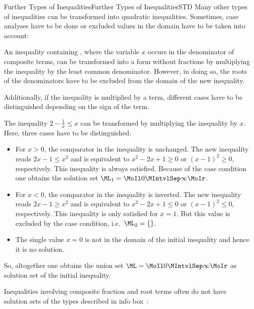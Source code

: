 \begin{MXContent}{Further Types of Inequalities}{Further Types of Inequalities}{STD}
Many other types of inequalities can be transformed into quadratic inequalities. Sometimes, 
case analyses have to be done or excluded values in the domain have to be taken into account:

\begin{MInfo}
An inequality containing , where the 
variable $x$ occurs in the denominator of composite terms, can be transformed into a 
form without fractions by multiplying the inequality by the least common denominator. 
However, in doing so, the roots of the denominators have to be excluded from the domain
of the new inequality. 

Additionally, if the inequality is multiplied by a term, different cases have to be distinguished 
depending on the sign of the term.
\end{MInfo}

\begin{MExample}
The inequality $2-\frac1x\leq x$ can be transformed by multiplying the inequality by $x$. Here, three 
cases have to be distinguished:
\begin{itemize}
\item{For $x>0$, the comparator in the inequality is unchanged. The new inequality
reads $2x-1\leq x^2$ and is equivalent to $x^2-2x+1\geq 0$ or $(x-1)^2\geq 0$, respectively.
This inequality is always satisfied. Because of the case condition one obtains 
the solution set $\ML_1=\MoIl 0\MIntvlSep \infty\MoIr$.}
\item{For $x<0$, the comparator in the inequality is inverted. The new inequality
reads $2x-1\geq x^2$ and is equivalent to $x^2-2x+1\leq 0$ or $(x-1)^2\leq 0$, respectively.
This inequality is only satisfied for $x=1$. But this value is excluded by the case condition, 
i.e.\ $\ML_2=\{\}$.}
\item{The single value $x=0$ is not in the domain of the initial inequality and hence it is
no solution.}
\end{itemize}

So, altogether one obtains the union set 
$\ML=\MoIl 0\MIntvlSep \infty\MoIr$ as solution set of the initial inequality.
\end{MExample}

Inequalities involving composite fraction and root terms often do not have solution
sets of the types described in info box~:


\end{MXContent}
